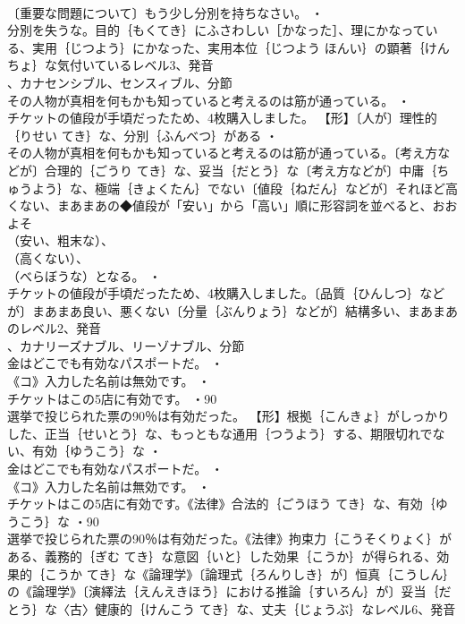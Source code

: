 \documentclass[8pt]{extreport}
\begin{document}
\begin{CJK}{UTF8}{min}
\\	〔重要な問題について〕もう少し分別を持ちなさい。 ・
\\	分別を失うな。目的｛もくてき｝にふさわしい［かなった］、理にかなっている、実用｛じつよう｝にかなった、実用本位｛じつよう ほんい｝の顕著｛けんちょ｝な気付いているレベル3、発音
\\	、カナセンシブル、センスィブル、分節
\\	その人物が真相を何もかも知っていると考えるのは筋が通っている。 ・
\\	チケットの値段が手頃だったため、4枚購入しました。		【形】〔人が〕理性的｛りせい てき｝な、分別｛ふんべつ｝がある ・
\\	その人物が真相を何もかも知っていると考えるのは筋が通っている。〔考え方などが〕合理的｛ごうり てき｝な、妥当｛だとう｝な〔考え方などが〕中庸｛ちゅうよう｝な、極端｛きょくたん｝でない〔値段｛ねだん｝などが〕それほど高くない、まあまあの◆値段が「安い」から「高い」順に形容詞を並べると、おおよそ
\\	（安い、粗末な）、
\\	（高くない）、
\\	（べらぼうな）となる。 ・
\\	チケットの値段が手頃だったため、4枚購入しました。〔品質｛ひんしつ｝などが〕まあまあ良い、悪くない〔分量｛ぶんりょう｝などが〕結構多い、まあまあのレベル2、発音
\\	、カナリーズナブル、リーゾナブル、分節
\\	金はどこでも有効なパスポートだ。 ・
\\	《コ》入力した名前は無効です。 ・
\\	チケットはこの5店に有効です。 ・90 
\\	選挙で投じられた票の90％は有効だった。		【形】根拠｛こんきょ｝がしっかりした、正当｛せいとう｝な、もっともな通用｛つうよう｝する、期限切れでない、有効｛ゆうこう｝な ・
\\	金はどこでも有効なパスポートだ。 ・
\\	《コ》入力した名前は無効です。 ・
\\	チケットはこの5店に有効です。《法律》合法的｛ごうほう てき｝な、有効｛ゆうこう｝な ・90 
\\	選挙で投じられた票の90％は有効だった。《法律》拘束力｛こうそくりょく｝がある、義務的｛ぎむ てき｝な意図｛いと｝した効果｛こうか｝が得られる、効果的｛こうか てき｝な《論理学》〔論理式｛ろんりしき｝が〕恒真｛こうしん｝の《論理学》〔演繹法｛えんえきほう｝における推論｛すいろん｝が〕妥当｛だとう｝な〈古〉健康的｛けんこう てき｝な、丈夫｛じょうぶ｝なレベル6、発音

\end{CJK}
\end{document}
